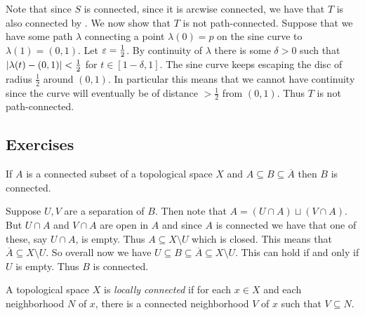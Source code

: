 \documentclass[letterpaper, 11pt]{article}
\begin{document}
\begin{ex}
\clearpage

  Note that since $S$ is connected, since it is arcwise connected, we have that $T$ is also connected by . We now show that $T$ is not path-connected.
  Suppose that we have some path $\lambda$ connecting a point $\lambda(0) = p$ on the sine curve to $\lambda(1) = (0, 1)$.
  Let $\varepsilon = \frac{1}{2}$.
  By continuity of $\lambda$ there is some $\delta > 0$ such that $\abs{\lambda(t) - (0, 1)} < \frac{1}{2}$ for $t \in [1 - \delta, 1]$.
  The sine curve keeps escaping the disc of radius $\frac{1}{2}$ around $(0, 1)$.
  In particular this means that we cannot have continuity since the curve will eventually be of distance $> \frac{1}{2}$ from $(0, 1)$.
  Thus $T$ is not path-connected.
\end{ex}

\clearpage

\subsection*{Exercises}

\begin{exercise}
  If $A$ is a connected subset of a topological space $X$ and $A \subseteq B \subseteq \overline{A}$ then $B$ is connected.
\end{exercise}
\begin{pf}
  Suppose $U, V$ are a separation of $B$.
  Then note that $A = (U \cap A) \sqcup (V \cap A)$.
  But $U \cap A$ and $V \cap A$ are open in $A$ and since $A$ is connected we have that one of these, say $U \cap A$, is empty.
  Thus $A \subseteq X \setminus U$ which is closed.
  This means that $\overline{A} \subseteq X \setminus U$.
  So overall now we have $U \subseteq B \subseteq \overline{A} \subseteq X \setminus U$.
  This can hold if and only if $U$ is empty.
  Thus $B$ is connected.
\end{pf}

\begin{defn}
  A topological space $X$ is \emph{locally connected} if for each $x \in X$ and each neighborhood $N$ of $x$, there is a connected neighborhood $V$ of $x$ such that $V \subseteq N$.
\end{defn}
\end{document}
